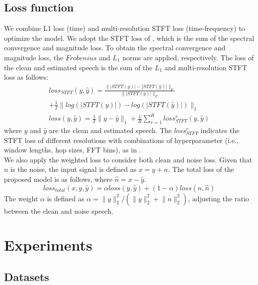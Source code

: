 \documentclass{article}
\begin{document}
\subsection{Loss function}
\label{sec:loss}
We combine L1 loss (time) and multi-resolution STFT loss (time-frequency) \cite{defossez2020real, yamamoto2020parallel} to optimize the model. We adopt the STFT loss of \cite{defossez2020real}, which is the sum of the spectral convergence and magnitude loss. To obtain the spectral convergence and magnitude loss, the $Frobenius$ and $L_{1}$ norms are applied, respectively. The loss of the clean and estimated speech is the sum of the $L_{1}$ and multi-resolution STFT loss as follows:
\begin{equation}\label{eq:loss}
  \begin{gathered}
    loss_{STFT}(y, \hat{y})= \frac{\lVert |STFT(y)| - |STFT(\hat{y})| \rVert_{F}}{\lVert |STFT(y)| \rVert_{F}} \\
    + \frac{1}{T}\lVert log(|STFT(y)|) - log(|STFT(\hat{y})|) \rVert_{1} \\
loss(y, \hat{y})= \frac{1}{T}\lVert y-\hat{y} \rVert_{1}+\frac{1}{R}\sum_{r=1}^{R}loss_{STFT}^{r}(y,\hat{y})
  \end{gathered}
\end{equation}
\noindent where $y$ and $\hat{y}$ are the clean and estimated speech. The $loss_{STFT}^{r}$ indicates the STFT loss of different resolutions with combinations of hyperparameter (i.e., window lengths, hop sizes, FFT bins), as in \cite{defossez2020real}. \\
\indent We also apply the weighted loss \cite{choi2019phaseaware} to consider both clean and noise loss. Given that $n$ is the noise, the input signal is defined as $x=y+n$. The total loss of the proposed model is as follows, where $\hat{n}=x-\hat{y}$.
\begin{equation}
loss_{total}(x, y, \hat{y})=\alpha loss(y, \hat{y})+(1-\alpha)loss(n, \hat{n})
\label{eq:total loss}
\end{equation}
\noindent The weight $\alpha$ is defined as $\alpha=\lVert y \rVert^{2}_{2}/(\lVert y \rVert^{2}_{2}+\lVert n \rVert^{2}_{2})$, adjusting the ratio between the clean and noise speech.

\section{Experiments}
\label{sec:exp}

\subsection{Datasets}
\label{sec:data}
\end{document}
